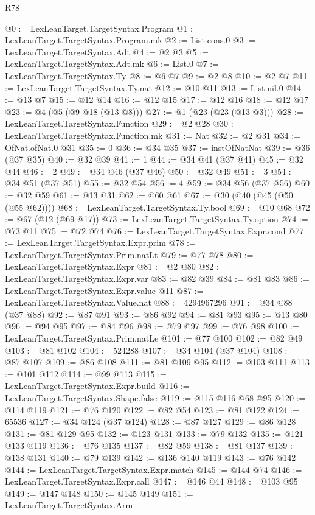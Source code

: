 \begin{lexlean}{R78}
\begin{coremodule}
@0 := LexLeanTarget.TargetSyntax.Program
@1 := LexLeanTarget.TargetSyntax.Program.mk
@2 := List.cons.{0}
@3 := LexLeanTarget.TargetSyntax.Adt
@4 := @2 @3
@5 := LexLeanTarget.TargetSyntax.Adt.mk
@6 := List.{0}
@7 := LexLeanTarget.TargetSyntax.Ty
@8 := @6 @7
@9 := @2 @8
@10 := @2 @7
@11 := LexLeanTarget.TargetSyntax.Ty.nat
@12 := @10 @11
@13 := List.nil.{0}
@14 := @13 @7
@15 := @12 @14
@16 := @12 @15
@17 := @12 @16
@18 := @12 @17
@23 := @4 (@5 (@9 @18 (@13 @8)))
@27 := @1 (@23 (@23 (@13 @3)))
@28 := LexLeanTarget.TargetSyntax.Function
@29 := @2 @28
@30 := LexLeanTarget.TargetSyntax.Function.mk
@31 := Nat
@32 := @2 @31
@34 := OfNat.ofNat.{0} @31
@35 := 0
@36 := @34 @35
@37 := instOfNatNat
@39 := @36 (@37 @35)
@40 := @32 @39
@41 := 1
@44 := @34 @41 (@37 @41)
@45 := @32 @44
@46 := 2
@49 := @34 @46 (@37 @46)
@50 := @32 @49
@51 := 3
@54 := @34 @51 (@37 @51)
@55 := @32 @54
@56 := 4
@59 := @34 @56 (@37 @56)
@60 := @32 @59
@61 := @13 @31
@62 := @60 @61
@67 := @30 (@40 (@45 (@50 (@55 @62))))
@68 := LexLeanTarget.TargetSyntax.Ty.bool
@69 := @10 @68
@72 := @67 (@12 (@69 @17))
@73 := LexLeanTarget.TargetSyntax.Ty.option
@74 := @73 @11
@75 := @72 @74
@76 := LexLeanTarget.TargetSyntax.Expr.cond
@77 := LexLeanTarget.TargetSyntax.Expr.prim
@78 := LexLeanTarget.TargetSyntax.Prim.natLt
@79 := @77 @78
@80 := LexLeanTarget.TargetSyntax.Expr
@81 := @2 @80
@82 := LexLeanTarget.TargetSyntax.Expr.var
@83 := @82 @39
@84 := @81 @83
@86 := LexLeanTarget.TargetSyntax.Expr.value @11
@87 := LexLeanTarget.TargetSyntax.Value.nat
@88 := 4294967296
@91 := @34 @88 (@37 @88)
@92 := @87 @91
@93 := @86 @92
@94 := @81 @93
@95 := @13 @80
@96 := @94 @95
@97 := @84 @96
@98 := @79 @97
@99 := @76 @98
@100 := LexLeanTarget.TargetSyntax.Prim.natLe
@101 := @77 @100
@102 := @82 @49
@103 := @81 @102
@104 := 524288
@107 := @34 @104 (@37 @104)
@108 := @87 @107
@109 := @86 @108
@111 := @81 @109 @95
@112 := @103 @111
@113 := @101 @112
@114 := @99 @113
@115 := LexLeanTarget.TargetSyntax.Expr.build
@116 := LexLeanTarget.TargetSyntax.Shape.false
@119 := @115 @116 @68 @95
@120 := @114 @119
@121 := @76 @120
@122 := @82 @54
@123 := @81 @122
@124 := 65536
@127 := @34 @124 (@37 @124)
@128 := @87 @127
@129 := @86 @128
@131 := @81 @129 @95
@132 := @123 @131
@133 := @79 @132
@135 := @121 @133 @119
@136 := @76 @135
@137 := @82 @59
@138 := @81 @137
@139 := @138 @131
@140 := @79 @139
@142 := @136 @140 @119
@143 := @76 @142
@144 := LexLeanTarget.TargetSyntax.Expr.match
@145 := @144 @74
@146 := LexLeanTarget.TargetSyntax.Expr.call
@147 := @146 @44
@148 := @103 @95
@149 := @147 @148
@150 := @145 @149
@151 := LexLeanTarget.TargetSyntax.Arm

\end{coremodule}
\end{lexlean}
